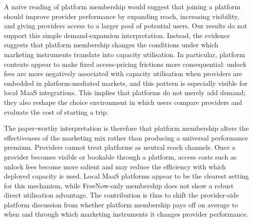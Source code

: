 \documentclass[11pt]{article}
\begin{document}
A naive reading of platform membership would suggest that joining a platform
should improve provider performance by expanding reach, increasing visibility,
and giving providers access to a larger pool of potential users. Our results do
not support this simple demand-expansion interpretation. Instead, the evidence
suggests that platform membership changes the conditions under which marketing
instruments translate into capacity utilisation. In particular, platform contexts
appear to make fixed access-pricing frictions more consequential: unlock fees are
more negatively associated with capacity utilisation when providers are embedded
in platform-mediated markets, and this pattern is especially visible for local
MaaS integrations. This implies that platforms do not merely add demand; they
also reshape the choice environment in which users compare providers and evaluate
the cost of starting a trip.

The paper-worthy interpretation is therefore that platform membership alters the
effectiveness of the marketing mix rather than producing a universal performance
premium. Providers cannot treat platforms as neutral reach channels. Once a
provider becomes visible or bookable through a platform, access costs such as
unlock fees become more salient and may reduce the efficiency with which deployed
capacity is used. Local MaaS platforms appear to be the clearest setting for this
mechanism, while FreeNow-only membership does not show a robust direct
utilisation advantage. The contribution is thus to shift the provider-side
platform discussion from whether platform membership pays off on average to when
and through which marketing instruments it changes provider performance.
\end{document}
